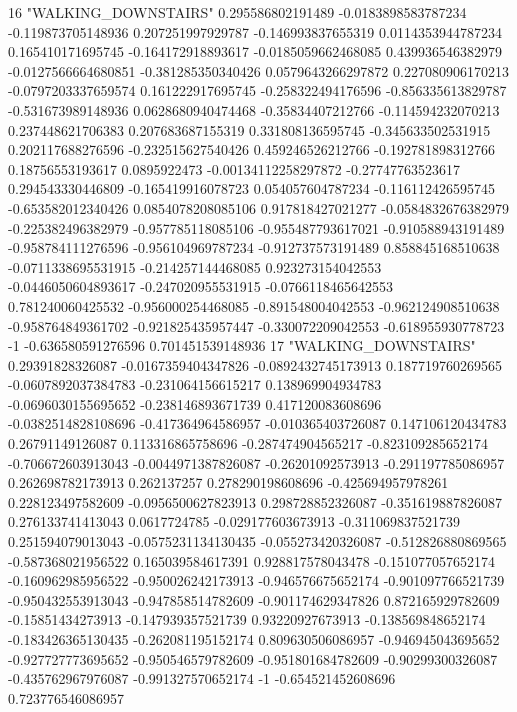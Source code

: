 16 "WALKING_DOWNSTAIRS" 0.295586802191489 -0.0183898583787234 -0.119873705148936 0.207251997929787 -0.146993837655319 0.0114353944787234 0.165410171695745 -0.164172918893617 -0.0185059662468085 0.439936546382979 -0.0127566664680851 -0.381285350340426 0.0579643266297872 0.227080906170213 -0.0797203337659574 0.161222917695745 -0.258322494176596 -0.856335613829787 -0.531673989148936 0.0628680940474468 -0.35834407212766 -0.114594232070213 0.237448621706383 0.207683687155319 0.331808136595745 -0.345633502531915 0.202117688276596 -0.232515627540426 0.459246526212766 -0.192781898312766 0.18756553193617 0.0895922473 -0.00134112258297872 -0.27747763523617 0.294543330446809 -0.165419916078723 0.054057604787234 -0.116112426595745 -0.653582012340426 0.0854078208085106 0.917818427021277 -0.0584832676382979 -0.225382496382979 -0.957785118085106 -0.955487793617021 -0.910588943191489 -0.958784111276596 -0.956104969787234 -0.912737573191489 0.858845168510638 -0.0711338695531915 -0.214257144468085 0.923273154042553 -0.0446050604893617 -0.247020955531915 -0.0766118465642553 0.781240060425532 -0.956000254468085 -0.891548004042553 -0.962124908510638 -0.958764849361702 -0.921825435957447 -0.330072209042553 -0.618955930778723 -1 -0.636580591276596 0.701451539148936
17 "WALKING_DOWNSTAIRS" 0.29391828326087 -0.0167359404347826 -0.0892432745173913 0.187719760269565 -0.0607892037384783 -0.231064156615217 0.138969904934783 -0.0696030155695652 -0.238146893671739 0.417120083608696 -0.0382514828108696 -0.417364964586957 -0.010365403726087 0.147106120434783 0.26791149126087 0.113316865758696 -0.287474904565217 -0.823109285652174 -0.706672603913043 -0.0044971387826087 -0.26201092573913 -0.291197785086957 0.262698782173913 0.262137257 0.278290198608696 -0.425694957978261 0.228123497582609 -0.0956500627823913 0.298728852326087 -0.351619887826087 0.276133741413043 0.0617724785 -0.029177603673913 -0.311069837521739 0.251594079013043 -0.0575231134130435 -0.055273420326087 -0.512826880869565 -0.587368021956522 0.165039584617391 0.928817578043478 -0.151077057652174 -0.160962985956522 -0.950026242173913 -0.946576675652174 -0.901097766521739 -0.950432553913043 -0.947858514782609 -0.901174629347826 0.872165929782609 -0.15851434273913 -0.147939357521739 0.93220927673913 -0.138569848652174 -0.183426365130435 -0.262081195152174 0.809630506086957 -0.946945043695652 -0.927727773695652 -0.950546579782609 -0.951801684782609 -0.90299300326087 -0.435762967976087 -0.991327570652174 -1 -0.654521452608696 0.723776546086957
